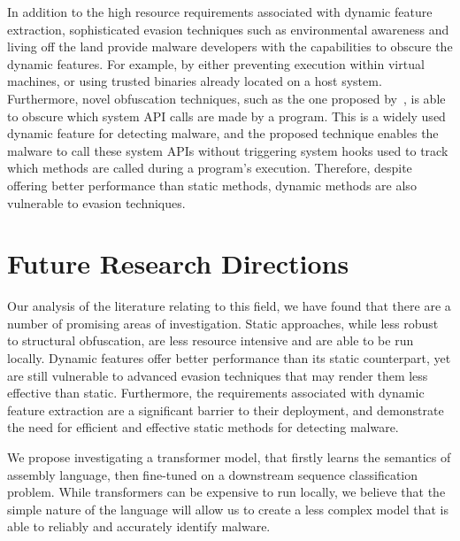 \documentclass{report}
\begin{document}
In addition to the high resource requirements associated with dynamic feature extraction, sophisticated evasion techniques such as environmental awareness and living off the land provide malware developers with the capabilities to obscure the dynamic features. For example, by either preventing execution within virtual machines, or using trusted binaries already located on a host system. Furthermore, novel obfuscation techniques, such as the one proposed by~\cite{liAPIASONovelAPI2023}, is able to obscure which system API calls are made by a program. This is a widely used dynamic feature for detecting malware, and the proposed technique enables the malware to call these system APIs without triggering system hooks used to track which methods are called during a program's execution. Therefore, despite offering better performance than static methods, dynamic methods are also vulnerable to evasion techniques.

\section{Future Research Directions}

Our analysis of the literature relating to this field, we have found that there are a number of promising areas of investigation. Static approaches, while less robust to structural obfuscation, are less resource intensive and are able to be run locally. Dynamic features offer better performance than its static counterpart, yet are still vulnerable to advanced evasion techniques that may render them less effective than static. Furthermore, the requirements associated with dynamic feature extraction are a significant barrier to their deployment, and demonstrate the need for efficient and effective static methods for detecting malware. 

We propose investigating a transformer model, that firstly learns the semantics of assembly language, then fine-tuned on a downstream sequence classification problem. While transformers can be expensive to run locally, we believe that the simple nature of the language will allow us to create a less complex model that is able to reliably and accurately identify malware.

\printbibliography
\end{document}
